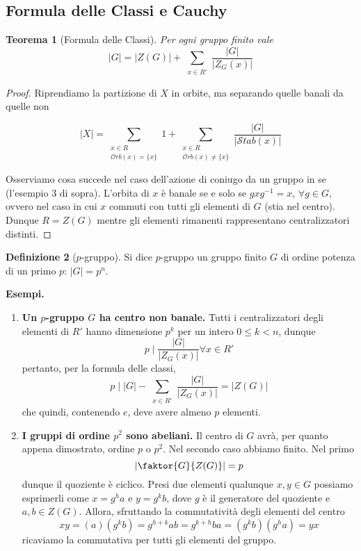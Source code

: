 \documentclass[a4paper]{article}
\newtheorem{theorem}{Teorema}[section]
\theoremstyle{remark}
\theoremstyle{definition}
\newtheorem{definition}[theorem]{Definizione}
\newcommand{\Orb}[1]{\mathcal{O}rb\left( #1 \right)}
\newcommand{\Stab}[1]{\mathcal{S}tab\left( #1 \right)}
\begin{document}
\subsection{Formula delle Classi e Cauchy}
\begin{multicols}{2}

\begin{theorem}[Formula delle Classi]
	Per ogni gruppo finito vale
	\[ |G| = |Z(G)| + \sum_{\substack{x \in R'}} \frac{|G|}{|Z_G(x)|} \]
\end{theorem}
\begin{proof}
	Riprendiamo la partizione di $ X $ in orbite, ma separando quelle banali da quelle non
	
	\[ |X| = \sum_{\substack{x \in R \\ \Orb{x} = \{x\} }} 1 + \sum_{\substack{x \in R \\ \Orb{x} \neq \{x\} }} \frac{|G|}{|\Stab{x}|} \]
	
	Osserviamo cosa succede nel caso dell'azione di coniugo da un gruppo in se (l'esempio 3 di sopra). L'orbita di $ x $ è banale se e solo se $ gxg^{-1} = x $, $ \forall g \in G $, ovvero nel caso in cui $ x $ commuti con tutti gli elementi di $ G $ (stia nel centro). Dunque $ R = Z(G) $ mentre gli elementi rimanenti rappresentano centralizzatori distinti.
\end{proof}

\begin{definition}[$ p $-gruppo]
	Si dice $ p $-gruppo un gruppo finito $ G $ di ordine potenza di un primo $ p $: $ |G| = p^n $.
\end{definition}

\textbf{Esempi.}
\begin{enumerate}
	\item \textbf{Un $ p $-gruppo $ G $ ha centro non banale.} Tutti i centralizzatori degli elementi di $ R' $ hanno dimensione $ p^k $ per un intero $ 0 \leq k < n $, dunque
	\[ p \mid \frac{|G|}{|Z_G(x)|} \forall x \in R' \]
	pertanto, per la formula delle classi,
	\[ p \mid |G| - \sum_{\substack{x \in R'}} \frac{|G|}{|Z_G(x)|} = |Z(G)| \]
	che quindi, contenendo $ e $, deve avere almeno $ p $ elementi.
	
	\item \textbf{I gruppi di ordine $ p^2 $ sono abeliani.} Il centro di $ G $ avrà, per quanto appena dimostrato, ordine $ p $ o $ p^2 $. Nel secondo caso abbiamo finito. Nel primo \[  \left|\faktor{G}{Z(G)}\right| = p \] dunque il quoziente è ciclico. Presi due elementi qualunque $ x, y \in G $ possiamo esprimerli come $ x = g^h a $ e $ y = g^k b $, dove $ g $ è il generatore del quoziente e $ a, b \in Z(G) $. Allora, sfruttando la commutatività degli elementi del centro \[ xy = ( a) (g^k b) = g^{h+k} ab = g^{k+h} ba = (g^k b) (g^h a) = yx \]
	ricaviamo la commutativa per tutti gli elementi del gruppo.
	

\end{enumerate}
\end{multicols}
\end{document}
